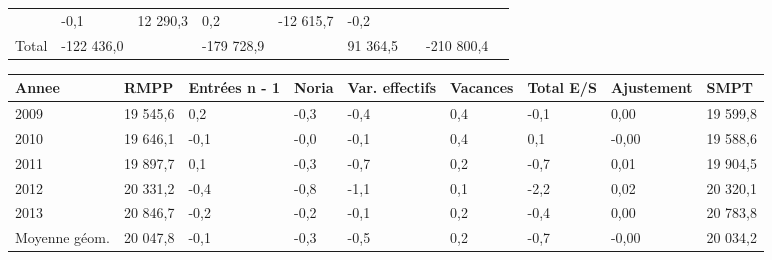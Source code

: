 \begin{longtable}[]{@{}lllllllll@{}}
\begin{minipage}[t]{0.16\columnwidth}
\end{minipage} & \begin{minipage}[t]{0.06\columnwidth}\raggedright
-0,1\strut
\end{minipage} & \begin{minipage}[t]{0.12\columnwidth}\raggedright
12 290,3\strut
\end{minipage} & \begin{minipage}[t]{0.06\columnwidth}\raggedright
0,2\strut
\end{minipage} & \begin{minipage}[t]{0.09\columnwidth}\raggedright
-12 615,7\strut
\end{minipage} & \begin{minipage}[t]{0.06\columnwidth}\raggedright
-0,2\strut
\end{minipage}\tabularnewline
\begin{minipage}[t]{0.05\columnwidth}\raggedright
Total\strut
\end{minipage} & \begin{minipage}[t]{0.10\columnwidth}\raggedright
-122 436,0\strut
\end{minipage} & \begin{minipage}[t]{0.06\columnwidth}\raggedright
\strut
\end{minipage} & \begin{minipage}[t]{0.16\columnwidth}\raggedright
-179 728,9\strut
\end{minipage} & \begin{minipage}[t]{0.06\columnwidth}\raggedright
\strut
\end{minipage} & \begin{minipage}[t]{0.12\columnwidth}\raggedright
91 364,5\strut
\end{minipage} & \begin{minipage}[t]{0.06\columnwidth}\raggedright
\strut
\end{minipage} & \begin{minipage}[t]{0.09\columnwidth}\raggedright
-210 800,4\strut
\end{minipage} & \begin{minipage}[t]{0.06\columnwidth}\raggedright
\strut
\end{minipage}\tabularnewline
\bottomrule
\end{longtable}

\begin{longtable}[]{@{}lllllllll@{}}
\toprule
Annee & RMPP & Entrées n - 1 & Noria & Var. effectifs & Vacances & Total
E/S & Ajustement & SMPT\tabularnewline
\midrule
\endhead
2009 & 19 545,6 & 0,2 & -0,3 & -0,4 & 0,4 & -0,1 & 0,00 & 19
599,8\tabularnewline
2010 & 19 646,1 & -0,1 & -0,0 & -0,1 & 0,4 & 0,1 & -0,00 & 19
588,6\tabularnewline
2011 & 19 897,7 & 0,1 & -0,3 & -0,7 & 0,2 & -0,7 & 0,01 & 19
904,5\tabularnewline
2012 & 20 331,2 & -0,4 & -0,8 & -1,1 & 0,1 & -2,2 & 0,02 & 20
320,1\tabularnewline
2013 & 20 846,7 & -0,2 & -0,2 & -0,1 & 0,2 & -0,4 & 0,00 & 20
783,8\tabularnewline
Moyenne géom. & 20 047,8 & -0,1 & -0,3 & -0,5 & 0,2 & -0,7 & -0,00 & 20
034,2\tabularnewline
\bottomrule
\end{longtable}

